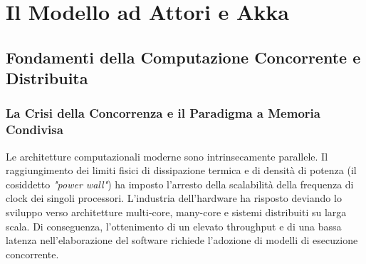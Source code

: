 \chapter{Il Modello ad Attori e Akka}

\section{Fondamenti della Computazione Concorrente e Distribuita}

\subsection{La Crisi della Concorrenza e il Paradigma a Memoria Condivisa}
Le architetture computazionali moderne sono intrinsecamente parallele. Il raggiungimento dei limiti fisici di dissipazione termica e di densità di potenza (il cosiddetto \textit{"power wall"}) ha imposto l'arresto della scalabilità della frequenza di clock dei singoli processori. L'industria dell'hardware ha risposto deviando lo sviluppo verso architetture multi-core, many-core e sistemi distribuiti su larga scala. Di conseguenza, l'ottenimento di un elevato throughput e di una bassa latenza nell'elaborazione del software richiede l'adozione di modelli di esecuzione concorrente.

